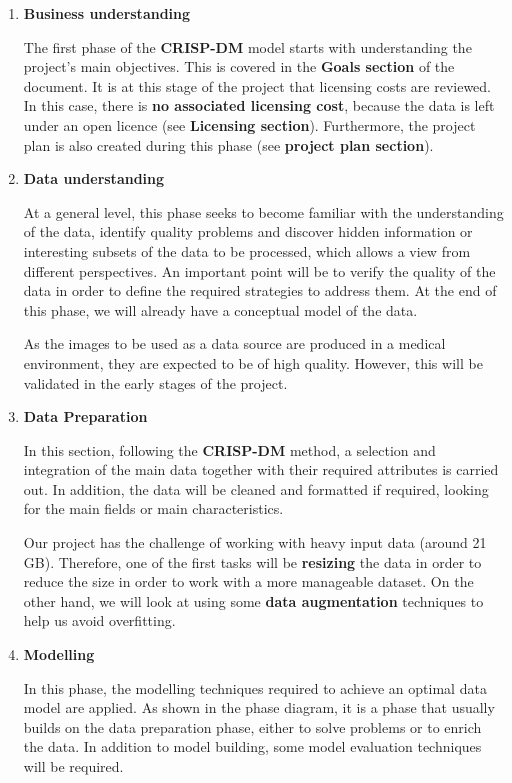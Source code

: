\begin{enumerate}
    \item \textbf{Business understanding}
    
    The first phase of the \textbf{CRISP-DM} model starts with understanding the project's main objectives. This is covered in the \textbf{ Goals section} of the document. It is at this stage of the project that licensing costs are reviewed. In this case, there is \textbf{no associated licensing cost}, because the data is left under an open licence (see \textbf{Licensing section}). Furthermore, the project plan is also created during this phase (see \textbf{project plan section}).
    \item \textbf{Data understanding}
    
    At a general level, this phase seeks to become familiar with the understanding of the data, identify quality problems and discover hidden information or interesting subsets of the data to be processed, which allows a view from different perspectives. An important point will be to verify the quality of the data in order to define the required strategies to address them. At the end of this phase, we will already have a conceptual model of the data.

    As the images to be used as a data source are produced in a medical environment, they are expected to be of high quality. However, this will be validated in the early stages of the project.

        
    \item \textbf{Data Preparation}

    In this section, following the \textbf{CRISP-DM} method, a selection and integration of the main data together with their required attributes is carried out. In addition, the data will be cleaned and formatted if required, looking for the main fields or main characteristics.

    Our project has the challenge of working with heavy input data (around 21 GB). Therefore, one of the first tasks will be \textbf{resizing} the data in order to reduce the size in order to work with a more manageable dataset. On the other hand, we will look at using some \textbf{data augmentation} techniques to help us avoid overfitting. 
    
    \item \textbf{Modelling}

    In this phase, the modelling techniques required to achieve an optimal data model are applied. As shown in the phase diagram, it is a phase that usually builds on the data preparation phase, either to solve problems or to enrich the data. In addition to model building, some model evaluation techniques will be required.


\end{enumerate}

